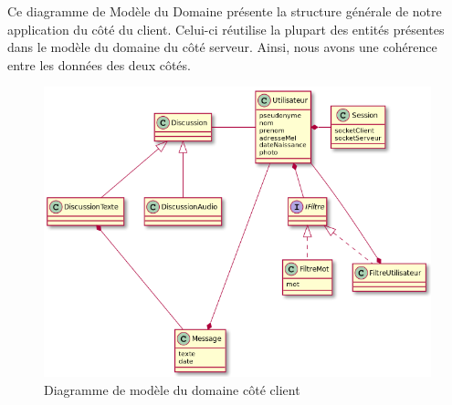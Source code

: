 \documentclass[a4paper,12pt]{article}
\begin{document}
	Ce diagramme de Modèle du Domaine présente la structure générale de notre application du côté du client.
	Celui-ci réutilise la plupart des entités présentes dans le modèle du domaine du côté serveur.
	Ainsi, nous avons une cohérence entre les données des deux côtés.
	\begin{figure}[H]
		\centerline{\includegraphics[width=16.5cm]{../diagrammes/img/modeleDomaineClient.png}}
		\caption{Diagramme de modèle du domaine côté client}
	\end{figure}

	\newpage
\end{document}
